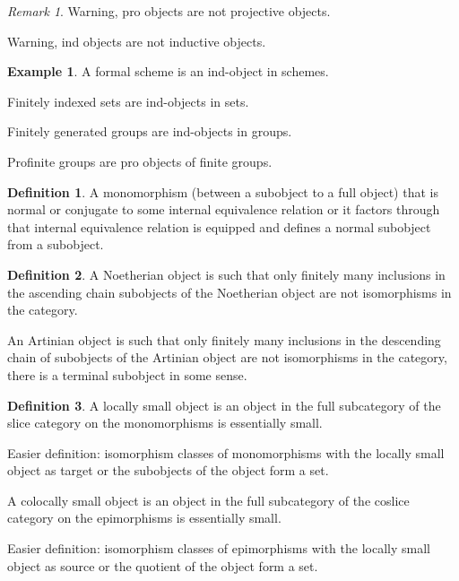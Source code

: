 \documentclass[10pt]{article}
\theoremstyle{plain}%
\theoremstyle{definition}
\newtheorem{definition}{Definition}[section]
\newtheorem{example}{Example}[section]
\theoremstyle{remark}
\newtheorem*{remark}{Remark}
\begin{document}
\begin{remark}
    Warning, pro objects are not projective objects.

    Warning, ind objects are not inductive objects.
\end{remark}

\begin{example}
    A formal scheme is an ind-object in schemes.

    Finitely indexed sets are ind-objects in sets.

    Finitely generated groups are ind-objects in groups.

    Profinite groups are pro objects of finite groups.
\end{example}

\begin{definition}
    A monomorphism (between a subobject to a full object) that is normal or conjugate to some internal equivalence relation or it factors through that internal equivalence relation is equipped and defines a normal subobject from a subobject.
\end{definition}

\begin{definition}
    A Noetherian object is such that only finitely many inclusions in the ascending chain subobjects of the Noetherian object are not isomorphisms in the category.

    An Artinian object is such that only finitely many inclusions in the descending chain of subobjects of the Artinian object are not isomorphisms in the category, there is a terminal subobject in some sense.
\end{definition}

\begin{definition}
    A locally small object is an object in the full subcategory of the slice category on the monomorphisms is essentially small.

    Easier definition: isomorphism classes of monomorphisms with the locally small object as target or the subobjects of the object form a set.

    A colocally small object is an object in the full subcategory of the coslice category on the epimorphisms is essentially small.

    Easier definition: isomorphism classes of epimorphisms with the locally small object as source or the quotient of the object form a set.
\end{definition}
\end{document}
